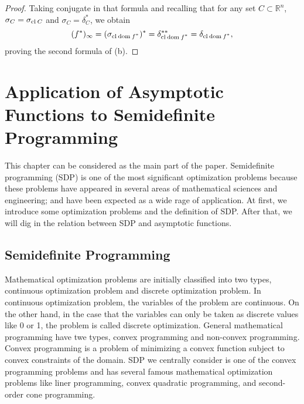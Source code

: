 \documentclass[a4paper,11pt, oneside]{book}
\theoremstyle{definition}
\newcommand{\NDemenstionalRealEuclideanSpace}{\mathbb{R}^n}
\newcommand{\Closure}[1]{\text{\rm cl\:${#1}$}} %
\newcommand{\Domain}[1]{\text{\rm dom\:${#1}$}} %
\newcommand{\ConjugateFunction}[1]{{#1}^*}
\newcommand{\SupportFunction}[1]{\sigma_{#1}}
\newcommand{\IndicatorFunction}[1]{\delta_{#1}}
\begin{document}
\begin{proof}
  Taking conjugate in that formula and recalling that for any set $C \subset \NDemenstionalRealEuclideanSpace$, $\SupportFunction{C} = \SupportFunction{\Closure{C}}$ and $\SupportFunction{C} = \IndicatorFunction{C}^*$, we obtain
  \begin{equation}
    (\ConjugateFunction{f})_{\infty} = (\SupportFunction{\Closure{\Domain{\ConjugateFunction{f}}}})^* = \IndicatorFunction{\Closure{\Domain{\ConjugateFunction{f}}}}^{**} = \IndicatorFunction{\Closure{\Domain{\ConjugateFunction{f}}}}, \notag
  \end{equation}
  proving the second formula of (b).
\end{proof}

\chapter{Application of Asymptotic Functions to Semidefinite Programming}

This chapter can be considered as the main part of the paper. Semidefinite programming (SDP) is one of the most significant optimization problems because these problems have appeared in several areas of mathematical sciences and engineering; and have been expected as a wide rage of application. At first, we introduce some optimization problems and the definition of SDP. After that, we will dig in the relation between SDP and asymptotic functions.

\section{Semidefinite Programming}

Mathematical optimization problems are initially classified into two types, continuous optimization problem and discrete optimization problem. In continuous optimization problem, the variables of the problem are continuous. On the other hand, in the case that the variables can only be taken as discrete values like 0 or 1, the problem is called discrete optimization. General mathematical programming have twe types, convex programming and non-convex programming. Convex programming is a problem of minimizing a convex function subject to convex constraints of the domain. SDP we centrally consider is one of the convex programming problems and has several famous mathematical optimization problems like liner programming, convex quadratic programming, and second-order cone programming.
\end{document}
